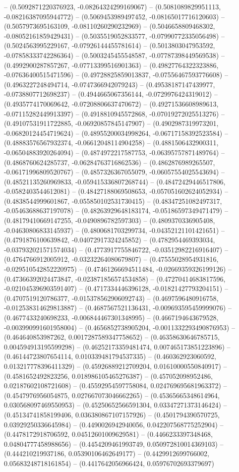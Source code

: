 -- (0.5092871220376923, -0.08264324299169067) -- (0.5081089829951113, -0.08216387095944772) -- (0.5069453989497452, -0.08165017716120603) -- (0.5057973695163109, -0.08110260290232969) -- (0.5046658809468302, -0.08052161859429431) -- (0.5035519052833577, -0.07990772335056498) -- (0.5024563995229167, -0.07926144455781614) -- (0.5013803047953592, -0.07858333742286364) -- (0.5003245455548587, -0.07787398449569538) -- (0.4992900287857267, -0.07713399516901363) -- (0.49827764322323886, -0.07636400515471596) -- (0.49728825859013837, -0.07556467593776608) -- (0.4963227248494714, -0.0747366942079243) -- (0.49538187147439977, -0.0738807712698237) -- (0.4944665067356144, -0.0729976424319012) -- (0.4935774170069642, -0.07208806637470672) -- (0.49271536608989613, -0.07115282449913397) -- (0.4918810945572868, -0.07019272025513276) -- (0.49107531911722885, -0.06920857845147907) -- (0.4902987319973201, -0.06820124454719624) -- (0.48955200034998264, -0.06717158392523584) -- (0.48883576567932374, -0.06612048114904258) -- (0.4881506432900311, -0.06504883920264094) -- (0.4874972217587753, -0.06395757871489764) -- (0.4868760624285737, -0.06284763716862536) -- (0.4862876989265507, -0.06171996809520767) -- (0.4857326367055079, -0.06057554025543694) -- (0.48521135260969833, -0.059415336807268744) -- (0.48472429446517806, -0.0582403544612081) -- (0.48427188069508653, -0.057051602624052934) -- (0.4838544999601867, -0.055850102531730415) -- (0.48347251082497317, -0.05463688637197078) -- (0.48263929648183174, -0.05186597349471479) -- (0.48179410669147255, -0.0490896782597303) -- (0.4809370336905408, -0.04630806833145937) -- (0.4800681703299734, -0.04352121101421651) -- (0.4791876100639842, -0.04072917324245852) -- (0.4782954469393034, -0.037932021571574034) -- (0.4773917755846722, -0.03512982216916407) -- (0.4764766912005912, -0.03232264080679807) -- (0.47555028954931816, -0.029510542852220975) -- (0.47461266694511484, -0.02669359326199126) -- (0.47366392024473847, -0.023871856574534858) -- (0.47270414683817596, -0.021045396903591407) -- (0.4717334446396128, -0.01821427793204151) -- (0.4707519120786377, -0.015378562906092743) -- (0.4697596480916758, -0.012538314629813887) -- (0.4687567521136431, -0.009693595459999076) -- (0.4677433240698233, -0.006844467301348995) -- (0.4667194643679528, -0.003990991601958004) -- (0.4656852738905204, -0.0011332293490876953) -- (0.464640853987262, 0.0017287589347758652) -- (0.46358630646785715, 0.004594913195599298) -- (0.46252173359481474, 0.007465173851223896) -- (0.46144723807654114, 0.010339481794537335) -- (0.460362923060592, 0.013217778396411329) -- (0.45926889212709204, 0.01610000550840917) -- (0.4581652492823256, 0.018986105465276387) -- (0.457052098952486, 0.02187602108721608) -- (0.45592954597758084, 0.024769695681963372) -- (0.4547976956054875, 0.027667073046662265) -- (0.45365665348614964, 0.030568097469550953) -- (0.45250652566591304, 0.03347271373146424) -- (0.45134741858199406, 0.036380867107157926) -- (0.4501794390570725, 0.03929250336645984) -- (0.4490026942940056, 0.042207568775252904) -- (0.4478172918706592, 0.04512601009629581) -- (0.4466233397348468, 0.04804777458988656) -- (0.4454209461993749, 0.050972810014369103) -- (0.444210219937186, 0.05390106462649177) -- (0.4429912699766002, 0.05683248718161854) -- (0.4417642056966424, 0.05976702693379697) 